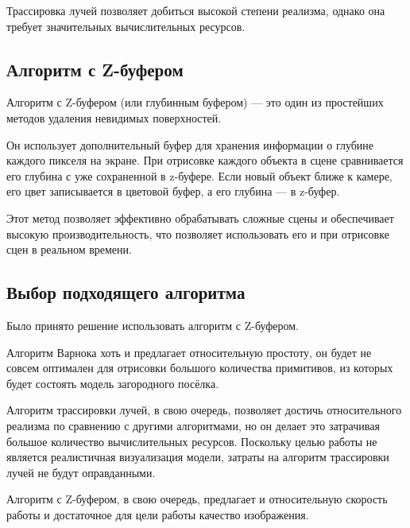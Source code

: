 Трассировка лучей позволяет добиться высокой степени реализма, однако она требует значительных вычислительных ресурсов.

\subsection*{Алгоритм с Z-буфером}

Алгоритм с Z-буфером (или глубинным буфером) --- это один из простейших~\cite{Rogers} методов удаления невидимых поверхностей. 

Он использует дополнительный буфер для хранения информации о глубине каждого пикселя на экране. При отрисовке каждого объекта в сцене сравнивается его глубина с уже сохраненной в z-буфере. Если новый объект ближе к камере, его цвет записывается в цветовой буфер, а его глубина — в z-буфер. 

Этот метод позволяет эффективно обрабатывать сложные сцены и обеспечивает высокую производительность, что позволяет использовать его и при отрисовке сцен в реальном времени.

\subsection*{Выбор подходящего алгоритма}

Было принято решение использовать алгоритм с Z-буфером. 

Алгоритм Варнока хоть и предлагает относительную простоту, он будет не совсем оптимален для отрисовки большого количества примитивов, из которых будет состоять модель загородного посёлка.

Алгоритм трассировки лучей, в свою очередь, позволяет достичь относительного реализма по сравнению с другими алгоритмами, но он делает это затрачивая большое количество вычислительных ресурсов. Поскольку целью работы не является реалистичная визуализация модели, затраты на алгоритм трассировки лучей не будут оправданными.

Алгоритм с Z-буфером, в свою очередь, предлагает и относительную скорость работы и достаточное для цели работы качество изображения.